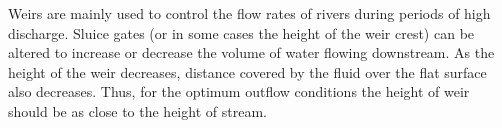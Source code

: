 \documentclass[11pt]{article}
\makeatletter
\newcommand{\boxspacing}{\kern\kvtcb@left@rule\kern\kvtcb@boxsep}
\newcommand{\prompt}[4]{
        {\ttfamily\llap{{\color{#2}[#3]:\hspace{3pt}#4}}\vspace{-\baselineskip}}
    }
\makeatother
\begin{document}
Weirs are mainly used to control the flow rates of rivers during periods
of high discharge. Sluice gates (or in some cases the height of the weir
crest) can be altered to increase or decrease the volume of water
flowing downstream. As the height of the weir decreases, distance
covered by the fluid over the flat surface also decreases. Thus, for the
optimum outflow conditions the height of weir should be as close to the
height of stream.

    \begin{tcolorbox}[breakable, size=fbox, boxrule=1pt, pad at break*=1mm,colback=cellbackground, colframe=cellborder]
\prompt{In}{incolor}{ }{\boxspacing}
\begin{Verbatim}[commandchars=\\\{\}]

\end{Verbatim}
\end{tcolorbox}


\end{document}

